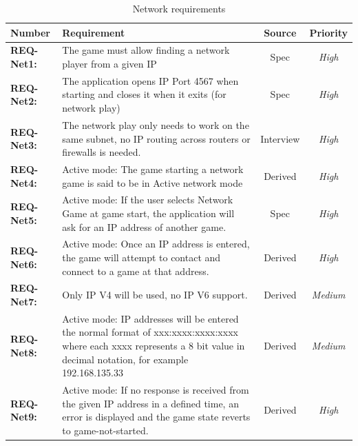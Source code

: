 \documentclass[a4paper,10pt]{article}
\begin{document}
\begin{table}[H]
\caption{Network  requirements}
\label{table:networkReqs}
\begin{tabular}{|| l | p{10.5cm}  |  c  | c ||} \hline  
\textbf{Number} & \textbf{Requirement} & \textbf{Source} & \textbf{Priority}\\ \hline

\textbf{REQ-Net1:}  & The game must allow finding a network player from a given IP& Spec & \textit{ High} \\

\textbf{REQ-Net2:} &
The application opens IP Port 4567 when starting and closes it when it exits  (for network play)
& Spec  &  \textit{High}\\

\textbf{REQ-Net3:} &
The network play only needs to work on the same subnet, no IP routing across routers or firewalls is needed. 
& Interview  &  \textit{High}\\

\textbf{REQ-Net4:} &  
Active mode: The game starting a network game is said to be in Active network mode
& Derived  &  \textit{High}\\

\textbf{REQ-Net5:} &  
Active mode: If the user selects Network Game at game start, the application will ask for an IP address of another game.
& Spec  &  \textit{High}\\

\textbf{REQ-Net6:} &  
Active mode: Once an IP address is entered, the game will attempt to contact and connect to a game at that address.
& Derived  &  \textit{High}\\

\textbf{REQ-Net7:} &  
Only IP V4 will be used, no IP V6 support.
& Derived  &  \textit{Medium}\\

\textbf{REQ-Net8:} &  
Active mode: IP addresses will be entered the normal format of xxx:xxxx:xxxx:xxxx where each xxxx represents a 8 bit value in decimal notation, for example 192.168.135.33
& Derived  &  \textit{Medium}\\

\textbf{REQ-Net9:} &  
Active mode: If no response is received from the given IP address in a defined time, an error is displayed and the game state reverts to game-not-started. & Derived  &  \textit{High}\\


\end{tabular}
\end{table}
\end{document}

